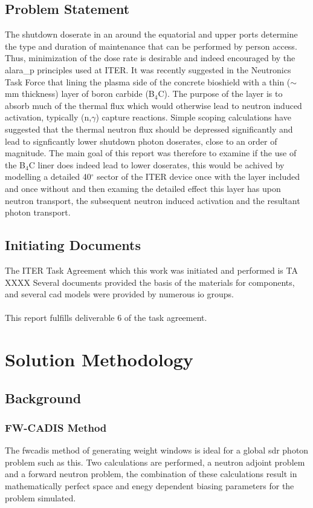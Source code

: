 \documentclass[12pt]{article}
\begin{document}
\subsection{Problem Statement}
The shutdown doserate in an around the equatorial and upper ports determine the
type and duration of maintenance that can be performed by person access. Thus,
minimization of the dose rate is desirable and indeed encouraged by the \gls{alara_p}
principles used at ITER. It was recently suggested in the Neutronics Task Force
that lining the plasma side of the concrete bioshield with a thin ($\sim$ mm
thickness) layer of boron carbide (B$_4$C). The purpose of the layer is to
absorb much of the thermal flux which would otherwise lead to neutron induced
activation, typically (n,$\gamma$) capture reactions. Simple scoping
calculations have suggested that the thermal neutron flux should be depressed
significantly and lead to signficantly lower shutdown photon doserates, close
to an order of magnitude. The main goal of this report was therefore to examine
if the use of the B$_4$C liner does indeed lead to lower doserates, this would
be achived by modelling a detailed 40$^{\circ}$ sector of the ITER device once
with the layer included and once without and then examing the detailed effect
this layer has upon neutron transport, the subsequent neutron induced activation
and the resultant photon transport.
\subsection{Initiating Documents}
The ITER Task Agreement which this work was initiated and performed is TA XXXX
Several documents provided the basis of the materials for components, and
several \gls{cad} models were provided by numerous \gls{io} groups.
\\
\\
This report fulfills deliverable 6 of the task agreement.
\newpage
\section{Solution Methodology}
\subsection{Background}
\subsubsection{FW-CADIS Method}
The \gls{fwcadis} method of generating weight windows is ideal for a global
\gls{sdr} photon problem such as this. Two calculations are performed, a
neutron adjoint problem and a forward neutron problem, the combination of these
calculations result in mathematically perfect space and enegy dependent biasing
parameters for the problem simulated. 
\end{document}
